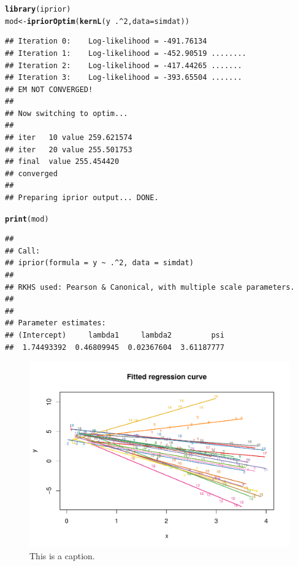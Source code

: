 \documentclass[english, 11pt]{article}\usepackage[]{graphicx}\usepackage[]{color}
\makeatletter
\def\maxwidth{ %
  \ifdim\Gin@nat@width>\linewidth
    \linewidth
  \else
    \Gin@nat@width
  \fi
}
\newcommand{\hlnum}[1]{\textcolor[rgb]{0.686,0.059,0.569}{#1}}%
\newcommand{\hlopt}[1]{\textcolor[rgb]{0,0,0}{#1}}%
\newcommand{\hlstd}[1]{\textcolor[rgb]{0.345,0.345,0.345}{#1}}%
\newcommand{\hlkwb}[1]{\textcolor[rgb]{0.69,0.353,0.396}{#1}}%
\newcommand{\hlkwc}[1]{\textcolor[rgb]{0.333,0.667,0.333}{#1}}%
\newcommand{\hlkwd}[1]{\textcolor[rgb]{0.737,0.353,0.396}{\textbf{#1}}}%
\newenvironment{kframe}{%
 \def\at@end@of@kframe{}%
 \ifinner\ifhmode%
  \def\at@end@of@kframe{\end{minipage}}%
  \begin{minipage}{\columnwidth}%
 \fi\fi%
 \def\FrameCommand##1{\hskip\@totalleftmargin \hskip-\fboxsep
 \colorbox{shadecolor}{##1}\hskip-\fboxsep
     \hskip-\linewidth \hskip-\@totalleftmargin \hskip\columnwidth}%
 \MakeFramed {\advance\hsize-\width
   \@totalleftmargin\z@ \linewidth\hsize
   \@setminipage}}%
 {\par\unskip\endMakeFramed%
 \at@end@of@kframe}
\newenvironment{knitrout}{}{} %
\makeatother
\begin{document}
\begin{knitrout}
\color{fgcolor}\begin{kframe}
\begin{alltt}
\hlkwd{library}\hlstd{(iprior)}
\hlstd{mod} \hlkwb{<-} \hlkwd{ipriorOptim}\hlstd{(}\hlkwd{kernL}\hlstd{(y} \hlopt{~} \hlstd{.} \hlopt{^} \hlnum{2}\hlstd{,} \hlkwc{data} \hlstd{= simdat))}
\end{alltt}
\begin{verbatim}
## Iteration 0:    Log-likelihood = -491.76134 
## Iteration 1:    Log-likelihood = -452.90519 ........
## Iteration 2:    Log-likelihood = -417.44265 .......
## Iteration 3:    Log-likelihood = -393.65504 .......
## EM NOT CONVERGED!
## 
## Now switching to optim...
## 
## iter   10 value 259.621574
## iter   20 value 255.501753
## final  value 255.454420 
## converged
## 
## Preparing iprior output... DONE.
\end{verbatim}
\begin{alltt}
\hlkwd{print}\hlstd{(mod)}
\end{alltt}
\begin{verbatim}
## 
## Call:
## iprior(formula = y ~ .^2, data = simdat)
## 
## RKHS used: Pearson & Canonical, with multiple scale parameters.
## 
## 
## Parameter estimates:
## (Intercept)     lambda1     lambda2         psi 
##  1.74493392  0.46809945  0.02367604  3.61187777
\end{verbatim}
\end{kframe}
\end{knitrout}
\begin{knitrout}
\color{fgcolor}\begin{figure}[h]

{\centering \includegraphics[width=\maxwidth]{figure/iprior_plot-1} 

}

\caption[This is a caption]{This is a caption.}\label{fig:iprior.plot}
\end{figure}


\end{knitrout}
\end{document}
